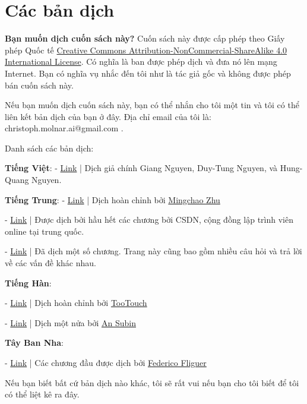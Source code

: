 \chapter{Các bản dịch}

\textbf{Bạn muốn dịch cuốn sách này?}
 Cuốn sách này được cấp phép theo Giấy phép Quốc tế \href{http://creativecommons.org/licenses/by-nc-sa/4.0/}{Creative Commons Attribution-NonCommercial-ShareAlike 4.0 International License}. Có nghĩa là ban được phép dịch và đưa nó lên mạng Internet. Bạn có nghĩa vụ nhắc đến tôi như là tác giả gốc và không được phép bán cuốn sách này.

Nếu bạn muốn dịch cuốn sách này, bạn có thể nhắn cho tôi một tin và tôi có thể liên kết bản dịch của bạn ở đây. Địa chỉ email của tôi là: christoph.molnar.ai@gmail.com .

Danh sách các bản dịch:

\textbf{Tiếng Việt}:
- \href{https://github.com/giangnguyen2412/InterpretableMLBook-Vietnamese}{Link} | Dịch giả chính Giang Nguyen, Duy-Tung Nguyen, và Hung-Quang Nguyen.

\textbf{Tiếng Trung}:
- \href{https://github.com/MingchaoZhu/InterpretableMLBook}{Link}  | Dịch hoàn chỉnh bởi \href{https://github.com/MingchaoZhu}{Mingchao Zhu}

- \href{https://blog.csdn.net/wizardforcel/article/details/98992150}{Link} | Được dịch bởi hầu hết các chương bởi CSDN, cộng đồng lập trình viên online tại trung quốc.

- \href{https://zhuanlan.zhihu.com/p/63408696}{Link} | Đã dịch một số chương. Trang này cũng bao gồm nhiều câu hỏi và trả lời về các vấn đề khác nhau.

\textbf{Tiếng Hàn}:

- \href{https://tootouch.github.io/IML/taxonomy\_of\_interpretability\_methods/}{Link} | Dịch hoàn chỉnh bởi \href{https://tootouch.github.io/}{TooTouch}

- \href{https://subinium.github.io/IML/}{Link} | Dịch một nửa bởi \href{https://subinium.github.io/}{An Subin}

\textbf{Tây Ban Nha}:

- \href{https://fedefliguer.github.io/AAI/}{Link} | Các chương đầu được dịch bởi \href{https://fedefliguer.github.io/}{Federico Fliguer}

Nếu bạn biết bất cứ bản dịch nào khác, tôi sẽ rất vui nếu bạn cho tôi biết để tôi có thể liệt kê ra đây.